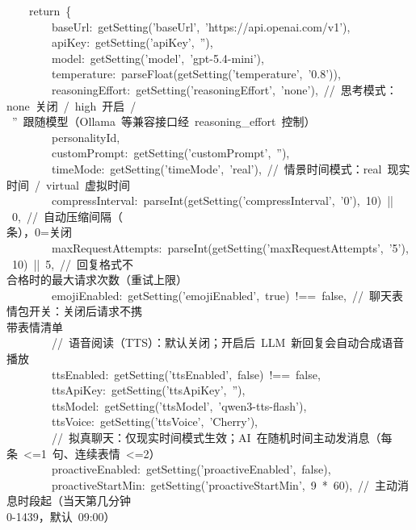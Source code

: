 \documentclass[a4paper,10pt]{article}
\begin{document}
{\ttfamily\footnotesize\raggedright
~~~~return~\{\\
~~~~~~~~baseUrl:~getSetting('baseUrl',~'https://api.openai.com/v1'),\\
~~~~~~~~apiKey:~getSetting('apiKey',~''),\\
~~~~~~~~model:~getSetting('model',~'gpt-5.4-mini'),\\
~~~~~~~~temperature:~parseFloat(getSetting('temperature',~'0.8')),\\
~~~~~~~~reasoningEffort:~getSetting('reasoningEffort',~'none'),~//~思考模式：none~关闭~/~high~开启~/\\
~''~跟随模型（Ollama~等兼容接口经~reasoning\_effort~控制）\\
~~~~~~~~personalityId,\\
~~~~~~~~customPrompt:~getSetting('customPrompt',~''),\\
~~~~~~~~timeMode:~getSetting('timeMode',~'real'),~//~情景时间模式：real~现实时间~/~virtual~虚拟时间\\
~~~~~~~~compressInterval:~parseInt(getSetting('compressInterval',~'0'),~10)~||~0,~//~自动压缩间隔（\\
条），0=关闭\\
~~~~~~~~maxRequestAttempts:~parseInt(getSetting('maxRequestAttempts',~'5'),~10)~||~5,~//~回复格式不\\
合格时的最大请求次数（重试上限）\\
~~~~~~~~emojiEnabled:~getSetting('emojiEnabled',~true)~!==~false,~//~聊天表情包开关：关闭后请求不携\\
带表情清单\\
~~~~~~~~//~语音阅读（TTS）：默认关闭；开启后~LLM~新回复会自动合成语音播放\\
~~~~~~~~ttsEnabled:~getSetting('ttsEnabled',~false)~!==~false,\\
~~~~~~~~ttsApiKey:~getSetting('ttsApiKey',~''),\\
~~~~~~~~ttsModel:~getSetting('ttsModel',~'qwen3-tts-flash'),\\
~~~~~~~~ttsVoice:~getSetting('ttsVoice',~'Cherry'),\\
~~~~~~~~//~拟真聊天：仅现实时间模式生效；AI~在随机时间主动发消息（每条~<=1~句、连续表情~<=2）\\
~~~~~~~~proactiveEnabled:~getSetting('proactiveEnabled',~false),\\
~~~~~~~~proactiveStartMin:~getSetting('proactiveStartMin',~9~*~60),~//~主动消息时段起（当天第几分钟~\\
0-1439，默认~09:00）\\
}
\end{document}
